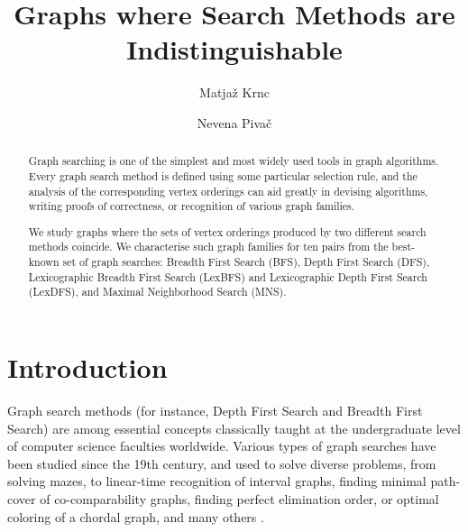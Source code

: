 \documentclass{svproc}
\begin{document}
\mainmatter              %
%
\title{Graphs where Search Methods are Indistinguishable}
%
%
\author{Matjaž Krnc \and Nevena Pivač}
%
%
%

\maketitle              %

\begin{abstract}
Graph searching is one of the simplest and most widely used tools in graph algorithms. Every graph search method is defined using some particular selection rule, and the analysis of  the corresponding vertex orderings can aid greatly in devising algorithms, writing proofs of correctness, or recognition of various graph families.

We study graphs where the sets of vertex orderings produced by two different search methods coincide. We characterise such graph families for ten pairs from the best-known set of graph searches: Breadth First Search (BFS), Depth First Search (DFS),  Lexicographic Breadth First Search (LexBFS) and Lexicographic Depth First Search (LexDFS), and Maximal Neighborhood Search (MNS). 

\end{abstract}

\newif\iflong
\newif\ifshort
\shorttrue

\section{Introduction}
Graph search methods (for instance, Depth First Search and Breadth First Search) are among essential concepts classically taught at the undergraduate level of computer science faculties worldwide.
Various types of graph searches have been  studied since the 19th century, and used to solve diverse problems, from solving mazes, to linear-time recognition of interval graphs, finding minimal path-cover of co-comparability graphs, finding perfect elimination order, or optimal coloring of a chordal graph, and many others  \cite{arikati1990linear,beisegel2018characterising,corneil2013,corneil2016power,golumbic2004book,kohler2014linear,rose1976,tarjan1972depth}. 
\end{document}
